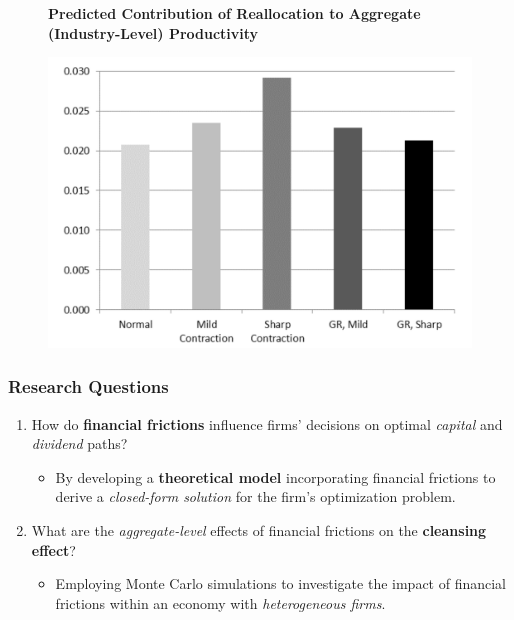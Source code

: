 \documentclass{beamer}
\begin{document}
\begin{frame}
    \begin{figure}
        
        \centering
        \textbf{Predicted Contribution of Reallocation to Aggregate (Industry-Level) Productivity}\par\medskip
        \includegraphics[scale=0.24]{GreatRecession.png}        
        \label{fig:enter-label}
    \end{figure}
\end{frame}
\begin{frame}
    \frametitle{Research Questions}
    \begin{enumerate}
        \item How do \textbf{financial frictions} influence firms' decisions on optimal \textit{capital} and \textit{dividend} paths?
        \begin{itemize}
            \item By developing a \textbf{theoretical model} incorporating financial frictions to derive a \textit{closed-form solution} for the firm's optimization problem.
        \end{itemize}
        \item What are the \textit{aggregate-level} effects of financial frictions on the \textbf{cleansing effect}?
        \begin{itemize}
            \item Employing Monte Carlo simulations to investigate the impact of financial frictions within an economy with \textit{heterogeneous firms}.
        \end{itemize}
    \end{enumerate}
\end{frame}
\end{document}
